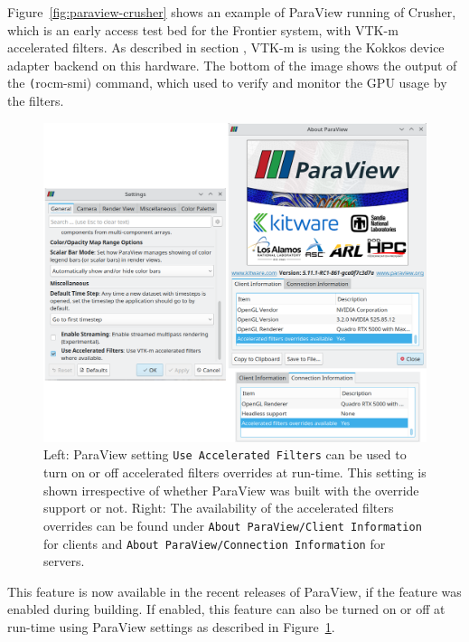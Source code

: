 Figure~\ref{fig:paraview-crusher} shows an example of ParaView running of Crusher, which is an early access test bed for the Frontier system, with VTK-m accelerated filters. As described in section , VTK-m is using the Kokkos device adapter backend on this hardware. The bottom of the image shows the output of the \texttt(rocm-smi) command, which used to verify and monitor the GPU usage by the filters.

\begin{figure}[htb]
  \includegraphics[width=\linewidth]{figures/pv-override-settings.png}
  \caption{Left: ParaView setting \texttt{Use Accelerated Filters} can be used to turn on or off accelerated filters overrides at run-time. This setting is shown irrespective of whether ParaView was built with the override support or not. Right: The availability of the accelerated filters overrides can be found under \texttt{About ParaView/Client Information} for clients and \texttt{About ParaView/Connection Information} for servers.}
  \label{fig:paraview_settings}
\end{figure}

This feature is now available in the recent releases of ParaView, if the feature was enabled during building. If enabled, this feature can also be turned on or off at run-time using ParaView settings as described in Figure~\ref{fig:paraview_settings}.

